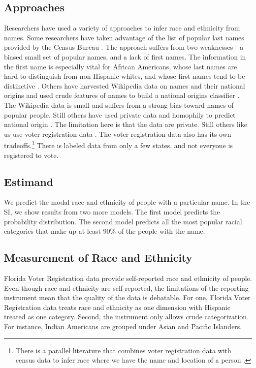 \documentclass[12pt, letterpaper]{article}
\begin{document}
\subsection*{Approaches} Researchers have used a variety of approaches to infer race and ethnicity from names. Some researchers have taken advantage of the list of popular last names provided by the Census Bureau \citep[see, e.g.,][]{fiscella2006use}. The approach suffers from two weaknesses---a biased small set of popular names, and a lack of first names. The information in the first name is especially vital for African Americans, whose last names are hard to distinguish from non-Hispanic whites, and whose first names tend to be distinctive \citep{bertrand2004emily}. Others have harvested Wikipedia data on names and their national origins and used crude features of names to build a national origins classifier \citep{ambekar2009name}. The Wikipedia data is small and suffers from a strong bias toward names of popular people. Still others have used private data and homophily to predict national origin \citep{ye2017nationality}. The limitation here is that the data are private. Still others like us use voter registration data \citep{sood2018predicting, parasurama2021racebert}. The voter registration data also has its own tradeoffs.\footnote{There is a parallel literature that combines voter registration data with census data to infer race where we have the name and location of a person \citep[see for e.g.,]{imai2016improving, kotovadeep}.} There is labeled data from only a few states, and not everyone is registered to vote.

\subsection*{Estimand} We predict the modal race and ethnicity of people with a particular name. In the SI, we show results from two more models. The first model predicts the probability distribution. The second model predicts all the most popular racial categories that make up at least 90\% of the people with the name.

\subsection*{Measurement of Race and Ethnicity} Florida Voter Registration data provide self-reported race and ethnicity of people. Even though race and ethnicity are self-reported, the limitations of the reporting instrument mean that the quality of the data is debatable. For one, Florida Voter Registration data treats race and ethnicity as one dimension with Hispanic treated as one category. Second, the instrument only allows crude categorization. For instance, Indian Americans are grouped under Asian and Pacific Islanders. 
\end{document}
